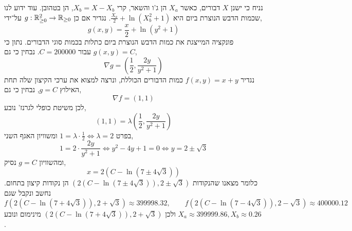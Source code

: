 



\question{}
\subquestion[3]{}
נניח כי ישנן $X$ דבורים, כאשר $X_a$ הן ג'ו והשאר, קרי $X_b = X - X_b$, הן בטהובן.
עוד ידוע לנו שכמות הדבש הנוצרת ביום היא $\frac{X_a}{2} + \ln(X_b^2 + 1)$.
נגדיר אם כן $g : \mathbb{R}_{\ge 0}^2 \to \mathbb{R}_{\ge 0}$ על־ידי,
\[
	g(x, y)
	= \frac{x}{2} + \ln(y^2 + 1)
\]
פונקציה המייצגת את כמות הדבש הנוצרת ביום כתלות בכמות סוגי הדבורים.
נתון כי $g(x, y) = C$ עבור $C = 200000$.
נבחין כי גם,
\[
	\nabla g = (\frac{1}{2}, \frac{2y}{y^2 + 1})
\]
נגדיר $f(x, y) = x + y$ כמות הדבורים הכוללת, ונרצה למצוא את ערכי הקיצון שלה תחת האילוץ $g = C$, נבחין כי גם,
\[
	\nabla f = (1, 1)
\]
לכן משיטת כופלי לגרנז' נובע,
\[
	(1, 1) = \lambda (\frac{1}{2}, \frac{2y}{y^2 + 1})
\]
בפרט $1 = \lambda \cdot \frac{1}{2} \iff \lambda = 2$ ומשוויון האגף השני,
\[
	1 = 2 \cdot \frac{2y}{y^2 + 1}
	\iff y^2 - 4y + 1 = 0
	\iff y = 2 \pm \sqrt{3}
\]
ומהשוויון $g = C$ נסיק,
\[
	x = 2(C - \ln(7 \pm 4 \sqrt{3}))
\]
כלומר מצאנו שהנקודות $(2(C - \ln(7 \pm 4 \sqrt{3})), 2 \pm \sqrt{3})$ הן נקודות קיצון בתחום.
נחשב ונקבל שגם
\[
	f(2(C - \ln(7 + 4 \sqrt{3})), 2 + \sqrt{3}) 
	\approx 399998.32,
	\qquad
	f(2(C - \ln(7 - 4 \sqrt{3})), 2 - \sqrt{3})
	\approx 400000.12
\]
ולכן $(2(C - \ln(7 + 4 \sqrt{3})), 2 + \sqrt{3})$ מינימום ונובע $X_a \approx 399999.86, X_b \approx 0.26$.



